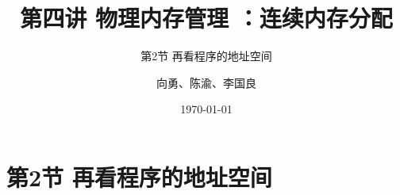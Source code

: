 


\title[第4讲]{第四讲 物理内存管理 ：连续内存分配} %
\subtitle{第2节 再看程序的地址空间}
\author{向勇、陈渝、李国良} %
\date{\today} %



\begin{frame}
\titlepage %
\end{frame}


\section{第2节 再看程序的地址空间}%
